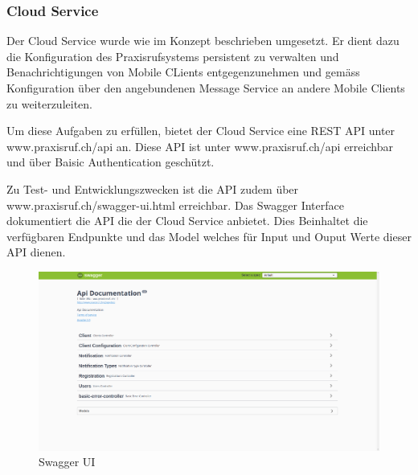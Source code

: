 \subsubsection{Cloud Service}

Der Cloud Service wurde wie im Konzept beschrieben umgesetzt.
Er dient dazu die Konfiguration des Praxisrufsystems persistent zu verwalten und Benachrichtigungen von Mobile CLients entgegenzunehmen und gemäss Konfiguration über den angebundenen Message Service an andere Mobile Clients zu weiterzuleiten.

Um diese Aufgaben zu erfüllen, bietet der Cloud Service eine REST API unter www.praxisruf.ch/api an.
Diese API ist unter www.praxisruf.ch/api erreichbar und über Baisic Authentication geschützt.

Zu Test- und Entwicklungszwecken ist die API zudem über www.praxisruf.ch/swagger-ui.html erreichbar.
Das Swagger Interface dokumentiert die API die der Cloud Service anbietet.
Dies Beinhaltet die verfügbaren Endpunkte und das Model welches für Input und Ouput Werte dieser API dienen.

\begin{figure}[h]
    \begin{minipage}[b]{1\textwidth}
        \includegraphics[width=\textwidth]{graphics/screenshots/cloud/swagger-home}
        \caption{Swagger UI}
    \end{minipage}
    \label{fig:swagger}
\end{figure}
\clearpage
